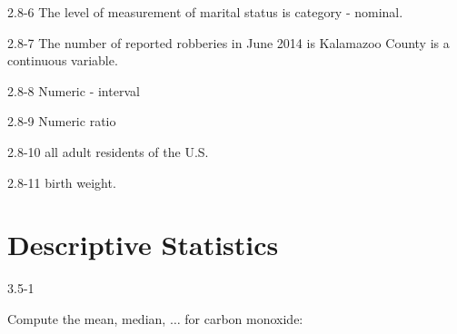 \begin{exsol@solution}{2.8-6}
	  The level of measurement of marital status is category - nominal.
\end{exsol@solution}
\begin{exsol@solution}{2.8-7}
	  The number of reported robberies in June 2014 is Kalamazoo County is a continuous variable.
\end{exsol@solution}
\begin{exsol@solution}{2.8-8}
    Numeric - interval

\end{exsol@solution}
\begin{exsol@solution}{2.8-9}
    Numeric  ratio

\end{exsol@solution}
\begin{exsol@solution}{2.8-10}
    all adult residents of the U.S.
\end{exsol@solution}
\begin{exsol@solution}{2.8-11}
    birth weight.
\end{exsol@solution}
\setcounter{chapter}{2}\chapter{Descriptive Statistics}
\begin{exsol@solution}{3.5-1}

	Compute the mean, median, $\dots$ for carbon monoxide:
\end{exsol@solution}
